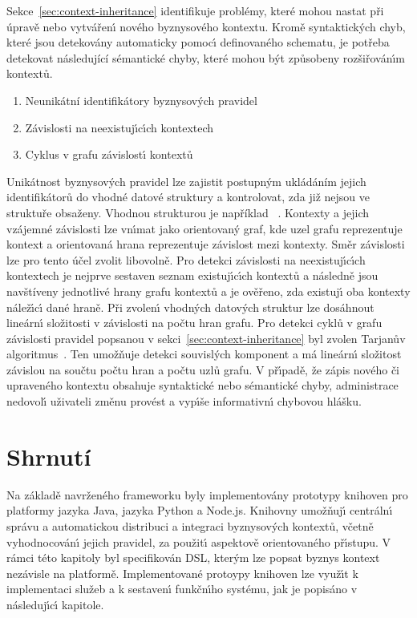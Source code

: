 Sekce~\ref{sec:context-inheritance} identifikuje problémy, které
mohou nastat při úpravě nebo vytvářen\'{\i} nového byznysového kontextu.
Kromě syntaktick\'ych chyb, které jsou detekovány automaticky pomoc\'{\i} definovaného schematu,
je potřeba detekovat následující sémantické chyby, které mohou b\'yt způsobeny rozšiřován\'{\i}m kontextů.
\begin{enumerate}[label=\alph*)]
    \item Neunikátní identifikátory byznysových pravidel
    \item Závislosti na neexistuj\'{\i}c\'{\i}ch kontextech
    \item Cyklus v grafu závislost\'{\i} kontextů
\end{enumerate}

Unikátnost byznysových pravidel lze zajistit postupným ukládáním jejich identifikátorů
do vhodné datové struktury a kontrolovat, zda již nejsou ve struktuře obsaženy. Vhodnou
strukturou je například ~\cite{hopcroft1983data}.
Kontexty a jejich vzájemné závislosti lze vn\'{\i}mat jako
orientovan\'y graf, kde uzel grafu reprezentuje kontext
a orientovaná hrana reprezentuje závislost mezi kontexty.
Směr závislosti lze pro tento účel zvolit libovolně.
Pro detekci závislosti na neexistuj\'{\i}c\'{\i}ch kontextech je nejprve
sestaven seznam existuj\'{\i}c\'{\i}ch kontextů a následně jsou navštíveny
jednotlivé hrany grafu kontextů a je ověřeno, zda existuj\'{\i} oba kontexty
nálež\'{\i}c\'{\i} dané hraně. Při zvolen\'{\i} vhodn\'ych datov\'ych struktur
lze dosáhnout lineárn\'{\i} složitosti v závislosti na počtu hran grafu.
Pro detekci cyklů v grafu závislosti pravidel popsanou v sekci~\ref{sec:context-inheritance} byl
zvolen Tarjanův algoritmus~\cite{tarjan1971depth}. Ten umožňuje detekci souvisl\'ych
komponent a má lineárn\'{\i} složitost závislou na součtu počtu hran a
počtu uzlů grafu. V př\'{\i}padě, že zápis nového či upraveného kontextu obsahuje syntaktické
nebo sémantické chyby, administrace nedovol\'{\i} uživateli změnu provést a vyp\'{\i}še informativn\'{\i}
chybovou hlášku.

\section{Shrnutí}

Na základě navrženého frameworku byly implementovány prototypy
knihoven pro platformy jazyka Java, jazyka Python a
Node.js. Knihovny umožňuj\'{\i} centráln\'{\i} správu a automatickou distribuci a integraci
byznysov\'ych kontextů, včetně vyhodnocován\'{\i} jejich pravidel, za
použit\'{\i} aspektově orientovaného př\'{\i}stupu.
V rámci této kapitoly byl specifikován \gls{DSL}, kter\'ym lze popsat
byznys kontext nezávisle na platformě.
Implementované protoypy knihoven lze využ\'{\i}t k implementaci služeb a k sestaven\'{\i}
funkčn\'{\i}ho systému, jak je popisáno v následuj\'{\i}c\'{\i} kapitole.

